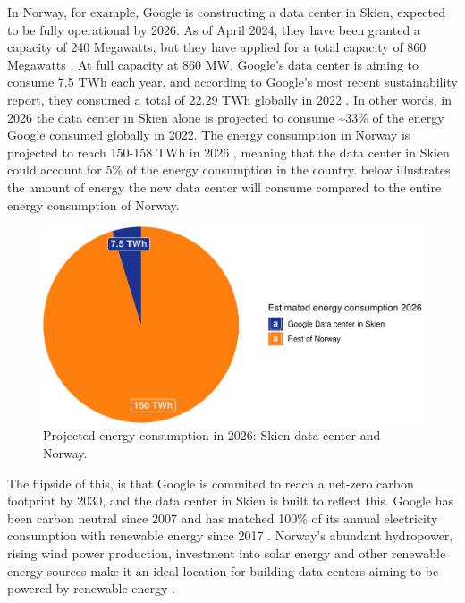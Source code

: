 \documentclass[
  table]{report}
\begin{document}
In Norway, for example, Google is constructing a data center in Skien,
expected to be fully operational by 2026. As of April 2024, they have
been granted a capacity of 240 Megawatts, but they have applied for a
total capacity of 860 Megawatts
\citep{rivrudInvesteringenAvGooglesenter2024}. At full capacity at 860
MW, Google's data center is aiming to consume 7.5 TWh each year, and
according to Google's most recent sustainability report, they consumed a
total of 22.29 TWh globally in 2022 \citep{Google2023Environmental2023}.
In other words, in 2026 the data center in Skien alone is projected to
consume \textasciitilde33\% of the energy Google consumed globally in
2022. The energy consumption in Norway is projected to reach 150-158 TWh
in 2026 \citep{gunnerodStatnettAnalyse2022}, meaning that the data
center in Skien could account for 5\% of the energy consumption in the
country.  below illustrates the amount of energy
the new data center will consume compared to the entire energy
consumption of Norway.

\vspace{0.25cm}

\begin{figure}[H]

{\centering \includegraphics[width=0.8\linewidth]{thesis_files/figure-latex/skienvsnorway-1} 

}

\caption{Projected energy consumption in 2026: Skien data center and Norway.}\label{fig:skienvsnorway}
\end{figure}

The flipside of this, is that Google is commited to reach a net-zero
carbon footprint by 2030, and the data center in Skien is built to
reflect this. Google has been carbon neutral since 2007 and has matched
100\% of its annual electricity consumption with renewable energy since
2017 \citep{googleTrackingOurCarbonFree}. Norway's abundant hydropower,
rising wind power production, investment into solar energy and other
renewable energy sources make it an ideal location for building data
centers aiming to be powered by renewable energy
\citep{norwegian-energyElectricityProduction2023}.
\end{document}
